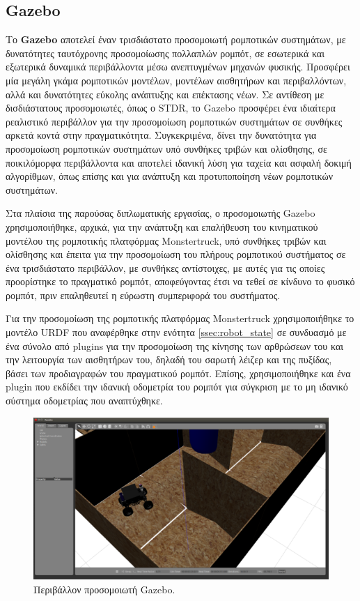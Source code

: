 \FloatBarrier

\subsection{Gazebo} \label{ssec:gazebo}
Το \textbf{Gazebo} αποτελεί έναν τρισδιάστατο προσομοιωτή ρομποτικών συστημάτων, με δυνατότητες ταυτόχρονης προσομοίωσης πολλαπλών ρομπότ, σε εσωτερικά και εξωτερικά δυναμικά περιβάλλοντα μέσω ανεπτυγμένων μηχανών φυσικής. Προσφέρει μία μεγάλη γκάμα ρομποτικών μοντέλων, μοντέλων αισθητήρων και περιβαλλόντων, αλλά και δυνατότητες εύκολης ανάπτυξης και επέκτασης νέων. Σε αντίθεση με δισδιάστατους προσομοιωτές, όπως ο STDR, το Gazebo προσφέρει ένα ιδιαίτερα ρεαλιστικό περιβάλλον για την προσομοίωση ρομποτικών συστημάτων σε συνθήκες αρκετά κοντά στην πραγματικότητα. Συγκεκριμένα, δίνει την δυνατότητα για προσομοίωση ρομποτικών συστημάτων υπό συνθήκες τριβών και ολίσθησης, σε ποικιλόμορφα περιβάλλοντα και αποτελεί ιδανική λύση για ταχεία και ασφαλή δοκιμή αλγορίθμων, όπως επίσης και για ανάπτυξη και προτυποποίηση νέων ρομποτικών συστημάτων.

\bigskip
Στα πλαίσια της παρούσας διπλωματικής εργασίας, ο προσομοιωτής Gazebo χρησιμοποιήθηκε, αρχικά, για την ανάπτυξη και επαλήθευση του κινηματικού μοντέλου της ρομποτικής πλατφόρμας Monstertruck, υπό συνθήκες τριβών και ολίσθησης και έπειτα για την προσομοίωση του πλήρους ρομποτικού συστήματος σε ένα τρισδιάστατο περιβάλλον, με συνθήκες αντίστοιχες, με αυτές για τις οποίες προορίστηκε το πραγματικό ρομπότ, αποφεύγοντας έτσι να τεθεί σε κίνδυνο το φυσικό ρομπότ, πριν επαληθευτεί η εύρωστη συμπεριφορά του συστήματος.

\bigskip
Για την προσομοίωση της ρομποτικής πλατφόρμας Monstertruck χρησιμοποιήθηκε το μοντέλο URDF που αναφέρθηκε στην ενότητα \ref{ssec:robot_state} σε συνδυασμό με ένα σύνολο από plugins για την προσομοίωση της κίνησης των αρθρώσεων του και την λειτουργία των αισθητήρων του, δηλαδή του σαρωτή λέιζερ και της πυξίδας, βάσει των προδιαγραφών του πραγματικού ρομπότ. Επίσης, χρησιμοποιήθηκε και ένα plugin που εκδίδει την ιδανική οδομετρία του ρομπότ για σύγκριση με το μη ιδανικό σύστημα οδομετρίας που αναπτύχθηκε.

\bigskip
\begin{figure}[!ht]
	\centering
	\includegraphics[width=0.7\linewidth]{Chapters/Chapter4/Figures/gazebo_simulator.png}
	\caption{Περιβάλλον προσομοιωτή Gazebo.}
	\label{fig:gazebo_simulator}
\end{figure}


